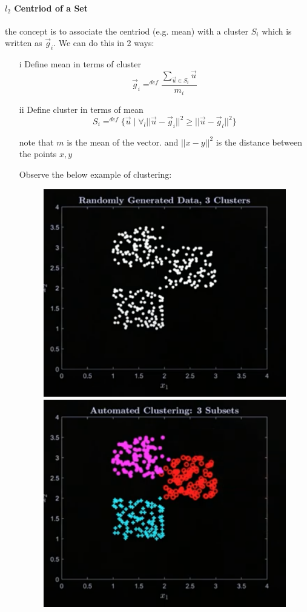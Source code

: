 \documentclass[12pt]{book}
\begin{document}
\paragraph{$l_2$ Centriod of a Set}
the concept is to associate the centriod (e.g. mean) with a cluster
$S_i$ which is written as $\vec g_i$. We can do this in 2 ways:
\begin{itemize}
        \item[i] Define mean in terms of cluster
\[\vec g_i =^{def} \frac{\sum_{\vec u\in S_i}\vec u}{m_i}\]
        \item[ii] Define cluster in terms of mean
\[S_i =^{def} \{\vec u \mid \forall_l ||\vec u - \vec g_i||^2 
\geq ||\vec u - \vec g_l||^2\}\]

note that $m$ is the mean of the vector. and $||x - y||^2$ is the 
distance between the points $x, y$
\pagebreak


Observe the below example of clustering:
\begin{figure}[h]
        \centering
        \includegraphics[scale=0.5]{./figures/cluster1.png}
        \includegraphics[scale=0.5]{./figures/cluster2.png}
\end{figure}


\end{itemize}
\end{document}

